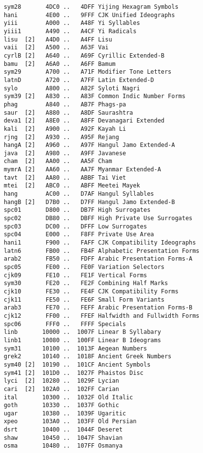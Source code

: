 \documentclass[uplatex,dvipdfmx,a4paper]{jsarticle}
\begin{document}
\begin{verbatim}
    sym28       4DC0 ..   4DFF Yijing Hexagram Symbols
    hani        4E00 ..   9FFF CJK Unified Ideographs
    yiii        A000 ..   A48F Yi Syllables
    yiii1       A490 ..   A4CF Yi Radicals
    lisu  [2]   A4D0 ..   A4FF Lisu
    vaii  [2]   A500 ..   A63F Vai
    cyrlB [2]   A640 ..   A69F Cyrillic Extended-B
    bamu  [2]   A6A0 ..   A6FF Bamum
    sym29       A700 ..   A71F Modifier Tone Letters
    latnD       A720 ..   A7FF Latin Extended-D
    sylo        A800 ..   A82F Syloti Nagri
    sym39 [2]   A830 ..   A83F Common Indic Number Forms
    phag        A840 ..   AB7F Phags-pa
    saur  [2]   A880 ..   A8DF Saurashtra
    deva1 [2]   A8E0 ..   A8FF Devanagari Extended
    kali  [2]   A900 ..   A92F Kayah Li
    rjng  [2]   A930 ..   A95F Rejang
    hangA [2]   A960 ..   A97F Hangul Jamo Extended-A
    java  [2]   A980 ..   A9FF Javanese
    cham  [2]   AA00 ..   AA5F Cham
    mymrA [2]   AA60 ..   AA7F Myanmar Extended-A
    tavt  [2]   AA80 ..   ABBF Tai Viet
    mtei  [2]   ABC0 ..   ABFF Meetei Mayek
    hang        AC00 ..   D7AF Hangul Syllables
    hangB [2]   D7B0 ..   D7FF Hangul Jamo Extended-B
    spc01       D800 ..   DB7F High Surrogates
    spc02       DB80 ..   DBFF High Private Use Surrogates
    spc03       DC00 ..   DFFF Low Surrogates
    spc04       E000 ..   F8FF Private Use Area
    hani1       F900 ..   FAFF CJK Compatibility Ideographs
    latn6       FB00 ..   FB4F Alphabetic Presentation Forms
    arab2       FB50 ..   FDFF Arabic Presentation Forms-A
    spc05       FE00 ..   FE0F Variation Selectors
    cjk09       FE10 ..   FE1F Vertical Forms
    sym30       FE20 ..   FE2F Combining Half Marks
    cjk10       FE30 ..   FE4F CJK Compatibility Forms
    cjk11       FE50 ..   FE6F Small Form Variants
    arab3       FE70 ..   FEFF Arabic Presentation Forms-B
    cjk12       FF00 ..   FFEF Halfwidth and Fullwidth Forms
    spc06       FFF0 ..   FFFF Specials                               
    linb       10000 ..  1007F Linear B Syllabary
    linb1      10080 ..  100FF Linear B Ideograms
    sym31      10100 ..  1013F Aegean Numbers
    grek2      10140 ..  1018F Ancient Greek Numbers
    sym40 [2]  10190 ..  101CF Ancient Symbols
    sym41 [2]  101D0 ..  1027F Phaistos Disc
    lyci  [2]  10280 ..  1029F Lycian
    cari  [2]  102A0 ..  102FF Carian
    ital       10300 ..  1032F Old Italic
    goth       10330 ..  1037F Gothic
    ugar       10380 ..  1039F Ugaritic
    xpeo       103A0 ..  103FF Old Persian
    dsrt       10400 ..  1044F Deseret
    shaw       10450 ..  1047F Shavian
    osma       10480 ..  107FF Osmanya

\end{verbatim}
\end{document}
